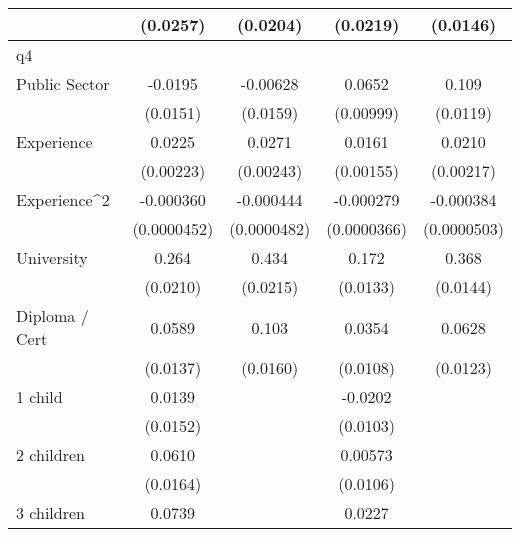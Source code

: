 {\begin{tabular}{l*{4}{c}}
                    &    (0.0257)         &    (0.0204)         &    (0.0219)         &    (0.0146)         \\
\hline
q4                  &                     &                     &                     &                     \\
Public Sector       &     -0.0195         &    -0.00628         &      0.0652\sym{***}&       0.109\sym{***}\\
                    &    (0.0151)         &    (0.0159)         &   (0.00999)         &    (0.0119)         \\
[1em]
Experience          &      0.0225\sym{***}&      0.0271\sym{***}&      0.0161\sym{***}&      0.0210\sym{***}\\
                    &   (0.00223)         &   (0.00243)         &   (0.00155)         &   (0.00217)         \\
[1em]
Experience^{2}      &   -0.000360\sym{***}&   -0.000444\sym{***}&   -0.000279\sym{***}&   -0.000384\sym{***}\\
                    & (0.0000452)         & (0.0000482)         & (0.0000366)         & (0.0000503)         \\
[1em]
University          &       0.264\sym{***}&       0.434\sym{***}&       0.172\sym{***}&       0.368\sym{***}\\
                    &    (0.0210)         &    (0.0215)         &    (0.0133)         &    (0.0144)         \\
[1em]
Diploma / Cert      &      0.0589\sym{***}&       0.103\sym{***}&      0.0354\sym{**} &      0.0628\sym{***}\\
                    &    (0.0137)         &    (0.0160)         &    (0.0108)         &    (0.0123)         \\
[1em]
1 child             &      0.0139         &                     &     -0.0202\sym{*}  &                     \\
                    &    (0.0152)         &                     &    (0.0103)         &                     \\
[1em]
2 children          &      0.0610\sym{***}&                     &     0.00573         &                     \\
                    &    (0.0164)         &                     &    (0.0106)         &                     \\
[1em]
3 children          &      0.0739\sym{**} &                     &      0.0227         &                     \\

\end{tabular}}
